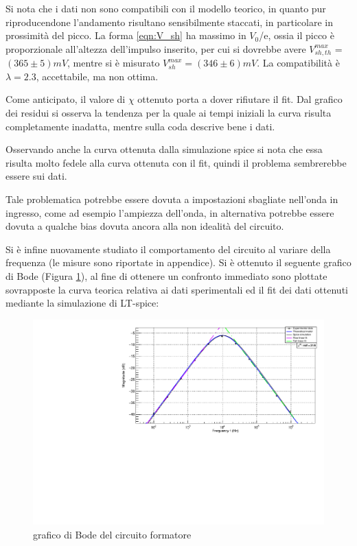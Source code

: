 \documentclass{article}
\begin{document}
Si nota che i dati non sono compatibili con il modello teorico, in quanto pur riproducendone l'andamento risultano sensibilmente 
staccati, in particolare in prossimità del picco. La forma \ref{eqn:V_sh} ha massimo in $V_0$/e, ossia il picco è proporzionale all'altezza dell'impulso
inserito, per cui si dovrebbe avere $V_{sh,th}^{max}$ = $(365 \pm 5) mV $, mentre si è misurato  $V_{sh}^{max}=(346 \pm 6)mV$. La compatibilità è $\lambda=2.3$,
accettabile, ma non ottima. 

Come anticipato, il valore di $\chi$ ottenuto porta a dover rifiutare il 
fit. Dal grafico dei residui si osserva la tendenza per la quale 
ai tempi iniziali la curva risulta completamente inadatta, mentre sulla coda descrive bene
i dati.

Osservando anche la curva ottenuta dalla simulazione spice si nota che 
essa risulta molto fedele alla curva ottenuta con il fit, quindi il problema
sembrerebbe essere sui dati.

Tale problematica potrebbe essere dovuta a impostazioni sbagliate nell'onda in ingresso,
come ad esempio l'ampiezza dell'onda, in alternativa potrebbe essere dovuta
a qualche bias dovuta ancora alla non idealità del circuito.


Si è infine nuovamente studiato il comportamento del circuito al variare della frequenza (le misure sono riportate in appendice). Si è 
ottenuto il seguente grafico di Bode (Figura \ref{fig:bodeshaper_no_pz}), al fine di ottenere un confronto immediato sono plottate 
sovrapposte la curva teorica relativa ai dati sperimentali ed il fit dei dati ottenuti mediante la simulazione di LT-spice:

\begin{center}
    \begin{figure}[H]
    \centering
    \includegraphics[scale=0.375, angle=0]{bodeshaper_no_pz.pdf}
    \caption{grafico di Bode del circuito formatore}
    \label{fig:bodeshaper_no_pz}
    \end{figure}
\end{center}
\end{document}
